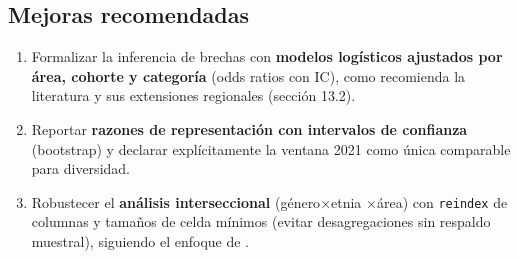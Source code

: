\subsection{Mejoras recomendadas}

\begin{enumerate}
  \item Formalizar la inferencia de brechas con \textbf{modelos logísticos
        ajustados por área, cohorte y categoría} (odds ratios con IC), como
        recomienda la literatura \citep{lariviere2013global} y sus extensiones
        regionales (sección 13.2).
  \item Reportar \textbf{razones de representación con intervalos de
        confianza} (bootstrap) y declarar explícitamente la ventana 2021 como
        única comparable para diversidad.
  \item Robustecer el \textbf{análisis interseccional} (género$\times$etnia
        $\times$área) con \texttt{reindex} de columnas y tamaños de celda
        mínimos (evitar desagregaciones sin respaldo muestral), siguiendo el
        enfoque de \citet{crenshaw1989demarginalizing}.
\end{enumerate}
